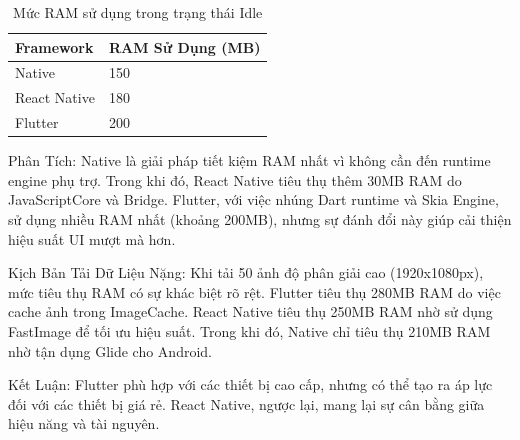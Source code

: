    \vspace{0.5em}
    
    \begin{table}[H]
      \centering
      \begin{tabular}{|p{5cm}|p{7cm}|}
      \hline
      \textbf{Framework} & \textbf{RAM Sử Dụng (MB)} \\
      \hline
      Native       & 150 \\
      React Native & 180 \\
      Flutter      & 200 \\
      \hline
      \end{tabular}
      \caption{Mức RAM sử dụng trong trạng thái Idle}
  \end{table}
  

  \begin{flushleft}
    \hspace*{0.8cm}Phân Tích:
    Native là giải pháp tiết kiệm RAM nhất vì không cần đến runtime engine phụ trợ. Trong khi đó, React Native tiêu thụ thêm 30MB RAM do JavaScriptCore và Bridge. Flutter, với việc nhúng Dart runtime và Skia Engine, sử dụng nhiều RAM nhất (khoảng 200MB), nhưng sự đánh đổi này giúp cải thiện hiệu suất UI mượt mà hơn.
  \end{flushleft}
  \begin{flushleft}
    \hspace*{0.8cm}Kịch Bản Tải Dữ Liệu Nặng: Khi tải 50 ảnh độ phân giải cao (1920x1080px), mức tiêu thụ RAM có sự khác biệt rõ rệt. Flutter tiêu thụ 280MB RAM do việc cache ảnh trong ImageCache. React Native tiêu thụ 250MB RAM nhờ sử dụng FastImage để tối ưu hiệu suất. Trong khi đó, Native chỉ tiêu thụ 210MB RAM nhờ tận dụng Glide cho Android.
  \end{flushleft}

  \begin{flushleft}
      \hspace*{0.8cm}Kết Luận: Flutter phù hợp với các thiết bị cao cấp, nhưng có thể tạo ra áp lực đối với các thiết bị giá rẻ. React Native, ngược lại, mang lại sự cân bằng giữa hiệu năng và tài nguyên.
  \end{flushleft}

